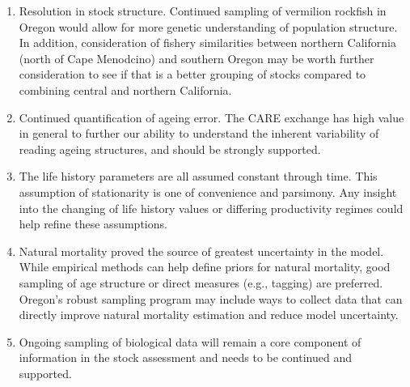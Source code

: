 \documentclass[11pt,
  english,
  a4paper,
]{article}
\begin{document}
\begin{enumerate}
\def\labelenumi{\arabic{enumi}.}
\item

  Resolution in stock structure. Continued sampling of vermilion rockfish in Oregon would allow for more genetic understanding of population structure. In addition, consideration of fishery similarities between northern California (north of Cape Menodcino) and southern Oregon may be worth further consideration to see if that is a better grouping of stocks compared to combining central and northern California.

  \tagmcend\tagstructend\tagstructend
\item

  Continued quantification of ageing error. The CARE exchange has high value in general to further our ability to understand the inherent variability of reading ageing structures, and should be strongly supported.

  \tagmcend\tagstructend\tagstructend
\item

  The life history parameters are all assumed constant through time. This assumption of stationarity is one of convenience and parsimony. Any insight into the changing of life history values or differing productivity regimes could help refine these assumptions.

  \tagmcend\tagstructend\tagstructend
\item

  Natural mortality proved the source of greatest uncertainty in the model. While empirical methods can help define priors for natural mortality, good sampling of age structure or direct measures (e.g., tagging) are preferred. Oregon's robust sampling program may include ways to collect data that can directly improve natural mortality estimation and reduce model uncertainty.

  \tagmcend\tagstructend\tagstructend
\item

  Ongoing sampling of biological data will remain a core component of information in the stock assessment and needs to be continued and supported.


\end{enumerate}
\end{document}
